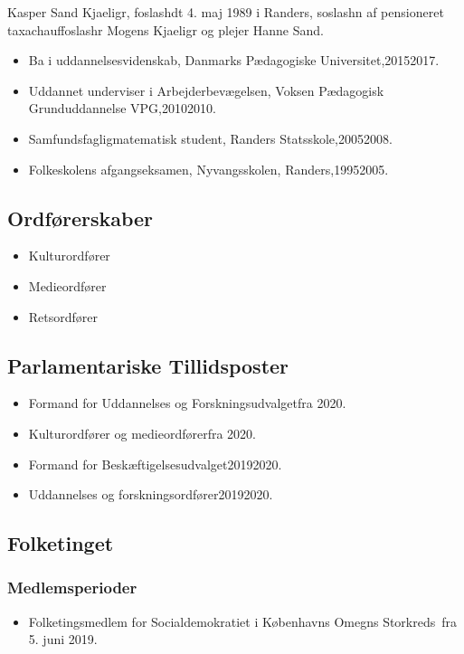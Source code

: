 \documentclass[11pt, a4paper]{awesome-cv}
\begin{document}
\makecvheader[R]
\makelettertitle
\begin{cvletter}
Kasper Sand Kjaeligr, foslashdt 4. maj 1989 i Randers, soslashn af pensioneret taxachauffoslashr Mogens Kjaeligr og plejer Hanne Sand.

\begin{itemize}
\item Ba i uddannelsesvidenskab, Danmarks Pædagogiske Universitet,20152017.
\item Uddannet underviser  i Arbejderbevægelsen,  Voksen Pædagogisk Grunduddannelse VPG,20102010.
\item Samfundsfagligmatematisk student, Randers Statsskole,20052008.
\item Folkeskolens afgangseksamen, Nyvangsskolen, Randers,19952005.
\end{itemize}
\subsection*{Ordførerskaber}
\begin{itemize}
\item Kulturordfører
\item Medieordfører
\item Retsordfører
\end{itemize}
\subsection*{Parlamentariske Tillidsposter}
\begin{itemize}
\item Formand for Uddannelses og Forskningsudvalgetfra 2020.
\item Kulturordfører og medieordførerfra 2020.
\item Formand for Beskæftigelsesudvalget20192020.
\item Uddannelses og forskningsordfører20192020.
\end{itemize}
\subsection*{Folketinget}
\subsubsection*{Medlemsperioder}
\begin{itemize}
\item Folketingsmedlem for Socialdemokratiet i Københavns Omegns Storkreds fra 5. juni 2019.
\end{itemize}

\end{cvletter}
\end{document}
